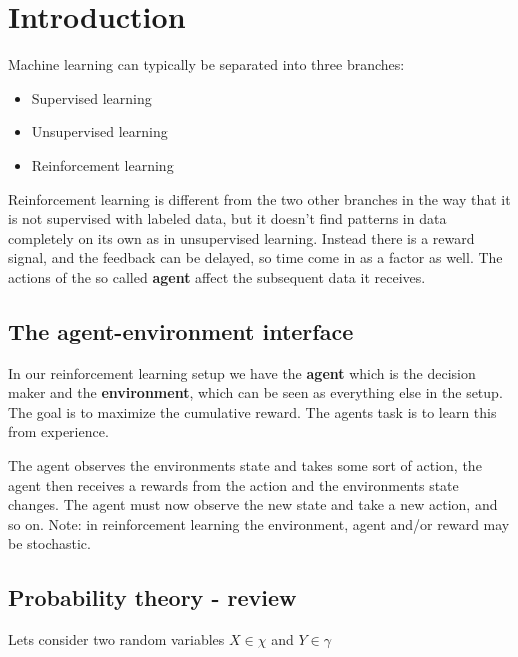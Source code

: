 \section{Introduction}
Machine learning can typically be separated into three branches: 

\begin{itemize}
	\item Supervised learning
	\item Unsupervised learning
	\item Reinforcement learning
\end{itemize}

Reinforcement learning is different from the two other branches in the way that it is not supervised with labeled data, but it doesn't find patterns in data completely on its own as in unsupervised learning. Instead there is a reward signal, and the feedback can be delayed, so time come in as a factor as well. The actions of the so called \textbf{agent} affect the subsequent data it receives. 

\subsection*{The agent-environment interface}
In our reinforcement learning setup we have the \textbf{agent} which is the decision maker and the \textbf{environment}, which can be seen as everything else in the setup. The goal is to maximize the cumulative reward. The agents task is to learn this from experience. 

The agent observes the environments state and takes some sort of action, the agent then receives a rewards from the action and the environments state changes. The agent must now observe the new state and take a new action, and so on. Note: in reinforcement learning the environment, agent and/or reward may be stochastic.  

\subsection*{Probability theory - review}
Lets consider two random variables $X \in \chi$ and $Y \in \gamma$ 

